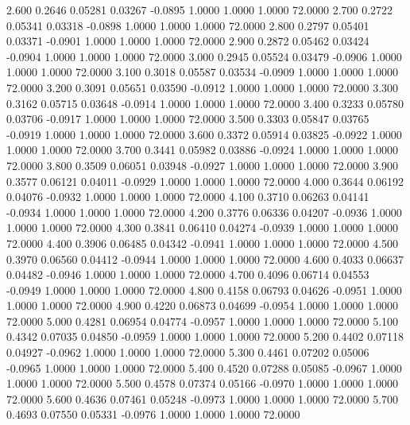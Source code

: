    2.600   0.2646   0.05281   0.03267  -0.0895   1.0000   1.0000   1.0000  72.0000
   2.700   0.2722   0.05341   0.03318  -0.0898   1.0000   1.0000   1.0000  72.0000
   2.800   0.2797   0.05401   0.03371  -0.0901   1.0000   1.0000   1.0000  72.0000
   2.900   0.2872   0.05462   0.03424  -0.0904   1.0000   1.0000   1.0000  72.0000
   3.000   0.2945   0.05524   0.03479  -0.0906   1.0000   1.0000   1.0000  72.0000
   3.100   0.3018   0.05587   0.03534  -0.0909   1.0000   1.0000   1.0000  72.0000
   3.200   0.3091   0.05651   0.03590  -0.0912   1.0000   1.0000   1.0000  72.0000
   3.300   0.3162   0.05715   0.03648  -0.0914   1.0000   1.0000   1.0000  72.0000
   3.400   0.3233   0.05780   0.03706  -0.0917   1.0000   1.0000   1.0000  72.0000
   3.500   0.3303   0.05847   0.03765  -0.0919   1.0000   1.0000   1.0000  72.0000
   3.600   0.3372   0.05914   0.03825  -0.0922   1.0000   1.0000   1.0000  72.0000
   3.700   0.3441   0.05982   0.03886  -0.0924   1.0000   1.0000   1.0000  72.0000
   3.800   0.3509   0.06051   0.03948  -0.0927   1.0000   1.0000   1.0000  72.0000
   3.900   0.3577   0.06121   0.04011  -0.0929   1.0000   1.0000   1.0000  72.0000
   4.000   0.3644   0.06192   0.04076  -0.0932   1.0000   1.0000   1.0000  72.0000
   4.100   0.3710   0.06263   0.04141  -0.0934   1.0000   1.0000   1.0000  72.0000
   4.200   0.3776   0.06336   0.04207  -0.0936   1.0000   1.0000   1.0000  72.0000
   4.300   0.3841   0.06410   0.04274  -0.0939   1.0000   1.0000   1.0000  72.0000
   4.400   0.3906   0.06485   0.04342  -0.0941   1.0000   1.0000   1.0000  72.0000
   4.500   0.3970   0.06560   0.04412  -0.0944   1.0000   1.0000   1.0000  72.0000
   4.600   0.4033   0.06637   0.04482  -0.0946   1.0000   1.0000   1.0000  72.0000
   4.700   0.4096   0.06714   0.04553  -0.0949   1.0000   1.0000   1.0000  72.0000
   4.800   0.4158   0.06793   0.04626  -0.0951   1.0000   1.0000   1.0000  72.0000
   4.900   0.4220   0.06873   0.04699  -0.0954   1.0000   1.0000   1.0000  72.0000
   5.000   0.4281   0.06954   0.04774  -0.0957   1.0000   1.0000   1.0000  72.0000
   5.100   0.4342   0.07035   0.04850  -0.0959   1.0000   1.0000   1.0000  72.0000
   5.200   0.4402   0.07118   0.04927  -0.0962   1.0000   1.0000   1.0000  72.0000
   5.300   0.4461   0.07202   0.05006  -0.0965   1.0000   1.0000   1.0000  72.0000
   5.400   0.4520   0.07288   0.05085  -0.0967   1.0000   1.0000   1.0000  72.0000
   5.500   0.4578   0.07374   0.05166  -0.0970   1.0000   1.0000   1.0000  72.0000
   5.600   0.4636   0.07461   0.05248  -0.0973   1.0000   1.0000   1.0000  72.0000
   5.700   0.4693   0.07550   0.05331  -0.0976   1.0000   1.0000   1.0000  72.0000
